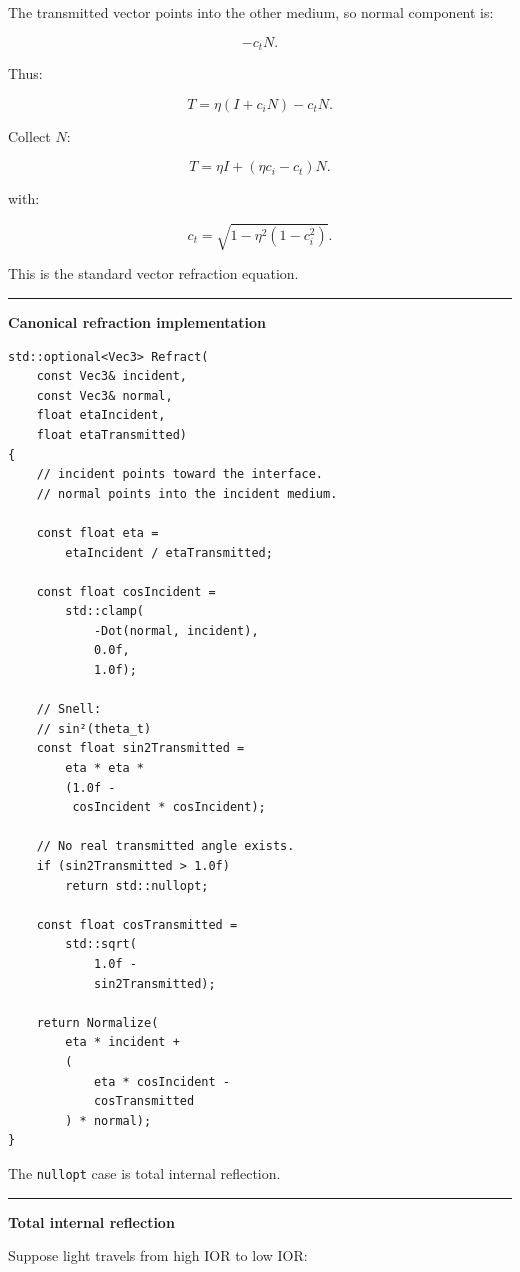 The transmitted vector points into the other medium, so normal component is:

\[
-c_tN.
\]

Thus:

\[
T=
\eta(I+c_iN)-c_tN.
\]

Collect \(N\):

\[
\boxed{
T=
\eta I+
(\eta c_i-c_t)N.
}
\]

with:

\[
\boxed{
c_t=
\sqrt{
1-\eta^2(1-c_i^2)
}.
}
\]

This is the standard vector refraction equation.

\begin{center}\rule{0.5\linewidth}{0.5pt}\end{center}

\textbf{Canonical refraction implementation}

\begin{verbatim}
std::optional<Vec3> Refract(
    const Vec3& incident,
    const Vec3& normal,
    float etaIncident,
    float etaTransmitted)
{
    // incident points toward the interface.
    // normal points into the incident medium.

    const float eta =
        etaIncident / etaTransmitted;

    const float cosIncident =
        std::clamp(
            -Dot(normal, incident),
            0.0f,
            1.0f);

    // Snell:
    // sin²(theta_t)
    const float sin2Transmitted =
        eta * eta *
        (1.0f -
         cosIncident * cosIncident);

    // No real transmitted angle exists.
    if (sin2Transmitted > 1.0f)
        return std::nullopt;

    const float cosTransmitted =
        std::sqrt(
            1.0f -
            sin2Transmitted);

    return Normalize(
        eta * incident +
        (
            eta * cosIncident -
            cosTransmitted
        ) * normal);
}
\end{verbatim}

The \texttt{nullopt} case is total internal reflection.

\begin{center}\rule{0.5\linewidth}{0.5pt}\end{center}

\textbf{Total internal reflection}

Suppose light travels from high IOR to low IOR:

